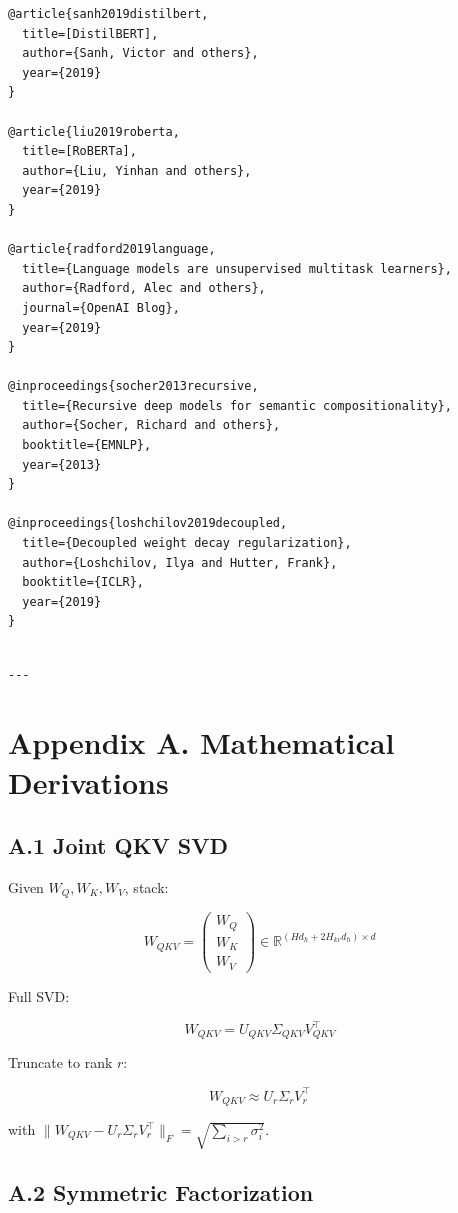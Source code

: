 \begin{lstlisting}
@article{sanh2019distilbert,
  title=[DistilBERT],
  author={Sanh, Victor and others},
  year={2019}
}

@article{liu2019roberta,
  title=[RoBERTa],
  author={Liu, Yinhan and others},
  year={2019}
}

@article{radford2019language,
  title={Language models are unsupervised multitask learners},
  author={Radford, Alec and others},
  journal={OpenAI Blog},
  year={2019}
}

@inproceedings{socher2013recursive,
  title={Recursive deep models for semantic compositionality},
  author={Socher, Richard and others},
  booktitle={EMNLP},
  year={2013}
}

@inproceedings{loshchilov2019decoupled,
  title={Decoupled weight decay regularization},
  author={Loshchilov, Ilya and Hutter, Frank},
  booktitle={ICLR},
  year={2019}
}
\end{lstlisting}
\begin{lstlisting}

---
\end{lstlisting}

\section{Appendix A. Mathematical Derivations}

\subsection{A.1 Joint QKV SVD}

Given $W_Q, W_K, W_V$, stack:

\[
W_{QKV} = \begin{pmatrix} W_Q \\ W_K \\ W_V \end{pmatrix} \in \mathbb{R}^{(H d_h + 2 H_{kv} d_h) \times d}
\]

Full SVD:

\[
W_{QKV} = U_{QKV} \Sigma_{QKV} V_{QKV}^\top
\]

Truncate to rank $r$:

\[
W_{QKV} \approx U_r \Sigma_r V_r^\top
\]

with $\|W_{QKV} - U_r \Sigma_r V_r^\top\|_F = \sqrt{\sum_{i > r} \sigma_i^2}$.

\subsection{A.2 Symmetric Factorization}

